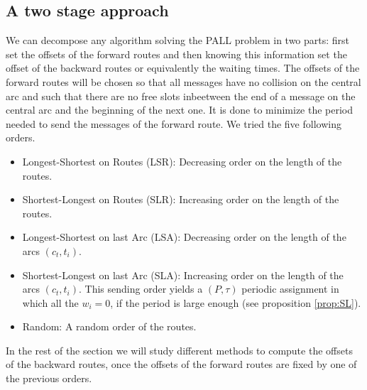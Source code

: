 \documentclass[10pt, conference, letterpaper]{IEEEtran}
\begin{document}
    
     \subsection{A two stage approach}
     
     We can decompose any algorithm solving the PALL problem in two parts: first set the offsets of the forward routes and then knowing this information set the offset of the backward routes or equivalently the waiting times.  
     The offsets of the forward routes will be chosen so that all messages have no collision on the central arc and such that there are no free slots inbeetween the end of a message on the central arc and the beginning of the next one. 
     It is done to minimize the period needed to send the messages of the forward route.
     We tried the five following orders. 
	\begin{itemize}
	 
	 \item Longest-Shortest on Routes (LSR): Decreasing order on the length of the routes.
	 \item Shortest-Longest on Routes (SLR): Increasing order on the length of the routes. 
	 \item Longest-Shortest on last Arc (LSA): Decreasing order on the length of the arcs $(c_t,t_i)$.
	 \item Shortest-Longest on last Arc (SLA): Increasing order on the length of the arcs $(c_t,t_i)$. This sending order yields a $(P,\tau)$ periodic assignment in which all the $w_i = 0$, if the period is large enough (see proposition \ref{prop:SL}).
	 \item Random: A random order of the routes.
	\end{itemize}

   In the rest of the section we will study different methods to compute the offsets of the backward routes, once
   the offsets of the forward routes are fixed by one of the previous orders.
     
%	 
% 
%    
\end{document}
